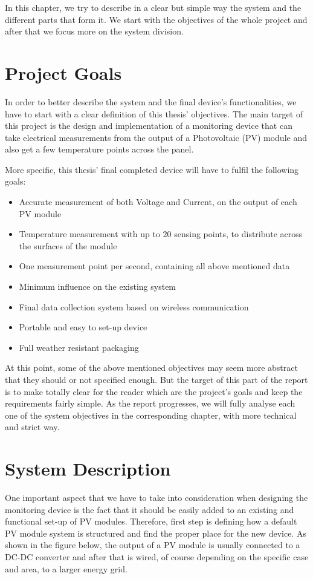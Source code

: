 In this chapter, we try to describe in a clear but simple way the system and the different parts that form it. We start with the objectives of the whole project and after that we focus more on the system division.

\section{Project Goals}
In order to better describe the system and the final device's functionalities, we have to start with a clear definition of this thesis' objectives. The main target of this project is the design and implementation of a monitoring device that can take electrical measurements from the output of a Photovoltaic (PV) module and also get a few temperature points across the panel.\par
More specific, this thesis' final completed device will have to fulfil the following goals:

\begin{itemize}
  \item Accurate measurement of both Voltage and Current, on the output of each PV module
  \item Temperature measurement with up to 20 sensing points, to distribute across the surfaces of the module
  \item One measurement point per second, containing all above mentioned data
  \item Minimum influence on the existing system
  \item Final data collection system based on wireless communication
  \item Portable and easy to set-up device
  \item Full weather resistant packaging
\end{itemize}

At this point, some of the above mentioned objectives may seem more abstract that they should or not specified enough. But the target of this part of the report is to make totally clear for the reader which are the project's goals and keep the requirements fairly simple. As the report progresses, we will fully analyse each one of the system objectives in the corresponding chapter, with more technical and strict way.

\section{System Description}
 One important aspect that we have to take into consideration when designing the monitoring device is the fact that it should be easily added to an existing and functional set-up of PV modules. Therefore, first step is defining how a default PV module system is structured and find the proper place for the new device. As shown in the figure below, the output of a PV module is usually connected to a DC-DC converter and after that is wired, of course depending on the specific case and area, to a larger energy grid.
 
